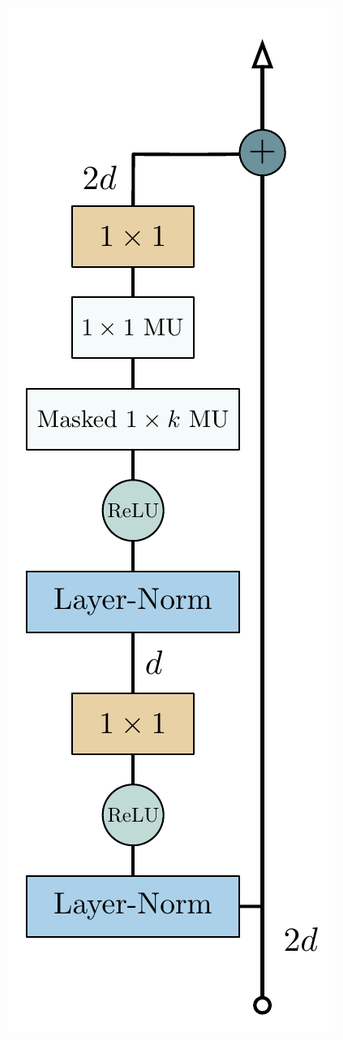 \documentclass{article}
\begin{document}
\begin{figure}[t]
    \hspace{1cm}
    \begin{subfigure}{}
        \includegraphics[scale=.28]{blocks/lm_decoder_block}
        \hspace{.25cm}

\end{subfigure}
\end{figure}
\end{document}
